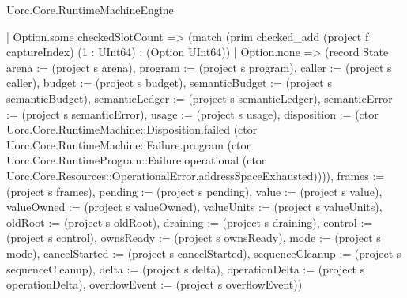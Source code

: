 \begin{lexlean}{Uorc.Core.RuntimeMachineEngine}
\begin{semanticmodule}
{      | Option.some checkedSlotCount => (match (prim checked_add (project f captureIndex) (1 : UInt64) : (Option UInt64))
        | Option.none => (record State {arena := (project s arena), program := (project s program), caller := (project s caller), budget := (project s budget), semanticBudget := (project s semanticBudget), semanticLedger := (project s semanticLedger), semanticError := (project s semanticError), usage := (project s usage), disposition := (ctor Uorc.Core.RuntimeMachine::Disposition.failed (ctor Uorc.Core.RuntimeMachine::Failure.program (ctor Uorc.Core.RuntimeProgram::Failure.operational (ctor Uorc.Core.Resources::OperationalError.addressSpaceExhausted)))), frames := (project s frames), pending := (project s pending), value := (project s value), valueOwned := (project s valueOwned), valueUnits := (project s valueUnits), oldRoot := (project s oldRoot), draining := (project s draining), control := (project s control), ownsReady := (project s ownsReady), mode := (project s mode), cancelStarted := (project s cancelStarted), sequenceCleanup := (project s sequenceCleanup), delta := (project s delta), operationDelta := (project s operationDelta), overflowEvent := (project s overflowEvent)})
}
\end{semanticmodule}
\end{lexlean}
